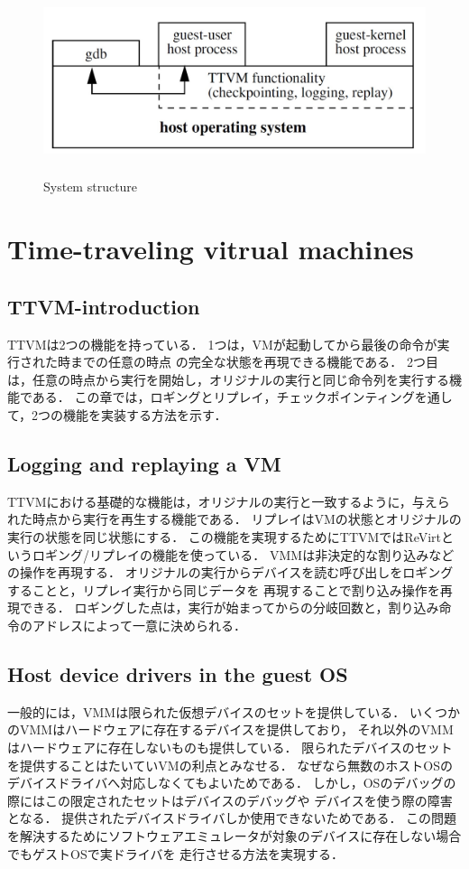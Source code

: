 \documentclass[12pt]{jsarticle}
\begin{document}
\begin{figure}[t]
\begin{center}
\includegraphics[height=5.5cm]{./fig2.jpg}          
\caption{System structure}
\label{fig:up}
\end{center}
\end{figure}




\section{Time-traveling vitrual machines}
\subsection{TTVM-introduction}
TTVMは2つの機能を持っている．
1つは，VMが起動してから最後の命令が実行された時までの任意の時点
の完全な状態を再現できる機能である．
2つ目は，任意の時点から実行を開始し，オリジナルの実行と同じ命令列を実行する機能である．
この章では，ロギングとリプレイ，チェックポインティングを通して，2つの機能を実装する方法を示す．

\subsection{Logging and replaying a VM}
TTVMにおける基礎的な機能は，オリジナルの実行と一致するように，与えられた時点から実行を再生する機能である．
リプレイはVMの状態とオリジナルの実行の状態を同じ状態にする．
この機能を実現するためにTTVMではReVirtというロギング/リプレイの機能を使っている．
VMMは非決定的な割り込みなどの操作を再現する．
オリジナルの実行からデバイスを読む呼び出しをロギングすることと，リプレイ実行から同じデータを
再現することで割り込み操作を再現できる．
ロギングした点は，実行が始まってからの分岐回数と，割り込み命令のアドレスによって一意に決められる．


\subsection{Host device drivers in the guest OS}
一般的には，VMMは限られた仮想デバイスのセットを提供している．
いくつかのVMMはハードウェアに存在するデバイスを提供しており，
それ以外のVMMはハードウェアに存在しないものも提供している．
限られたデバイスのセットを提供することはたいていVMの利点とみなせる．
なぜなら無数のホストOSのデバイスドライバへ対応しなくてもよいためである．
しかし，OSのデバッグの際にはこの限定されたセットはデバイスのデバッグや
デバイスを使う際の障害となる．
提供されたデバイスドライバしか使用できないためである．
この問題を解決するためにソフトウェアエミュレータが対象のデバイスに存在しない場合でもゲストOSで実ドライバを
走行させる方法を実現する．
\end{document}
